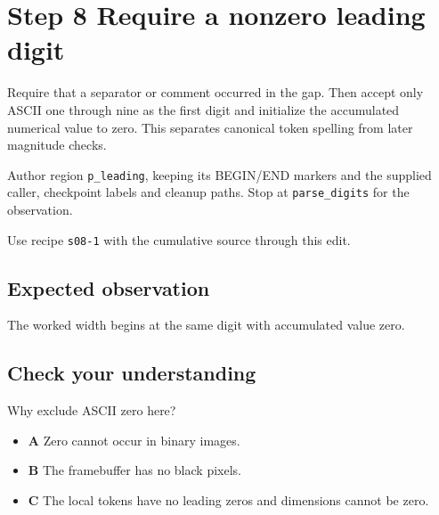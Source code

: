 \section{Step 8 Require a nonzero leading digit}\label{ppm-s08}

Require that a separator or comment occurred in the gap. Then accept only ASCII one through nine as the first digit and initialize the accumulated numerical value to zero. This separates canonical token spelling from later magnitude checks.

Author region \texttt{p\_leading}, keeping its BEGIN/END markers and the supplied caller, checkpoint labels and cleanup paths. Stop at \texttt{parse\_digits} for the observation.

Use recipe \texttt{s08-1} with the cumulative source through this edit.

\subsection{Expected observation}
The worked width begins at the same digit with accumulated value zero.

\subsection{Check your understanding}
Why exclude ASCII zero here?

\begin{itemize}
  \item \textbf{A} Zero cannot occur in binary images.
  \item \textbf{B} The framebuffer has no black pixels.
  \item \textbf{C} The local tokens have no leading zeros and dimensions cannot be zero.
\end{itemize}
